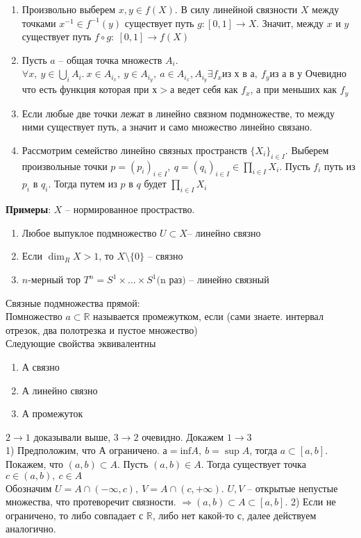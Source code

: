 	\begin{enumerate}
		\item 
		Произвольно выберем $x,y \in f(X)$. В силу линейной связности $X$ между точками $x^{-1} \in f^{-1}(y)$ существует путь $g:[0,1] \rightarrow X$. Значит, между $x$ и $y$ существует путь $f\circ g:\ [0,1] \rightarrow f(X)$\\
		\item 
		Пусть $a$ -- общая точка множеств $A_i$. $\forall x,\ y \in \bigcup_i A_i.\ x\in A_{i_x},\ y\in A_{i_y},\ a\in A_{i_x}, A_{i_y} \exists f_x \text{из х в а},\ f_y \text{из а в у}$ Очевидно что есть функция которая при $х > а$ ведет себя как $f_x$, а при меньших как $f_y$\\ 
		\item 
		Если любые две точки лежат в линейно связном подмножестве, то между ними существует путь, а значит и само множество линейно связано.\\
		\item 
		Рассмотрим семейство линейно связных пространств $\{X_i\}_{i\in I}$. Выберем произвольные точки $p = (p_i)_{i\in I},\ q = (q_i)_{i\in I} \in \prod_{i\in I} X_i$. Пусть $f_i$ путь из $p_i$ в $q_i$. Тогда путем из $p$ в $q$ будет $\prod_{i\in I} X_i$
	\end{enumerate}
	\textbf{Примеры}: $X$ -- нормированное простраство. 
	\begin{enumerate}
		\item 
		Любое выпуклое подмножество $U\subset X$-- линейно связно
		\item 
		Если $\dim_R X>1$, то $X\setminus\{0\}$ -- связно
		\item 
		$n$-мерный тор $T^n = S^1\times \ldots \times S^1 \text{(n раз)}$ -- линейно связный
	\end{enumerate}
	Связные подмножества прямой:\\
	Помножество $a\subset \mathbb{R}$ называется промежутком, если (сами знаете. интервал отрезок, два полотрезка и пустое множество)\\
	Следующие свойства эквивалентны 
	\begin{enumerate}
		\item $А$ связно 
		\item $А$ линейно связно 
		\item $А$ промежуток		
	\end{enumerate}
	$2 \rightarrow 1$ доказывали выше, $3 \rightarrow 2$ очевидно. Докажем $1 \rightarrow 3$\\
	1) Предположим, что А ограничено. $а = \text{inf} A,\ b=\sup A$, тогда $a \subset[a,b]$. Покажем, что $(a,b)\subset A$. Пусть $(a,b) \in A$. Тогда существует точка $c\in (a,b),\ c\in A$\\
	Обозначим $U = A\cap ( -\infty, c),\ V = A\cap (c,+ \infty)$. $U, V$ -- открытые непустые множества, что протеворечит связности. $\Rightarrow (a,b)\subset A \subset [a,b]$.
	2) Если не ограничено, то либо совпадает с $\mathbb{R}$, либо нет какой-то $с$, далее действуем аналогично.
	

